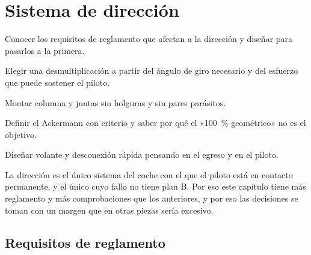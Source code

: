 \chapter{Sistema de dirección}
\label{ch:direccion}

\begin{objetivos}
  \item Conocer los requisitos de reglamento que afectan a la dirección y
        diseñar para pasarlos a la primera.
  \item Elegir una desmultiplicación a partir del ángulo de giro necesario y del
        esfuerzo que puede sostener el piloto.
  \item Montar columna y juntas sin holguras y sin pares parásitos.
  \item Definir el Ackermann con criterio y saber por qué el «\SI{100}{\percent}
        geométrico» no es el objetivo.
  \item Diseñar volante y desconexión rápida pensando en el egreso y en el
        piloto.
\end{objetivos}


La dirección es el único sistema del coche con el que el piloto está en
contacto permanente, y el único cuyo fallo no tiene plan B. Por eso este
capítulo tiene más reglamento y más comprobaciones que los anteriores, y por eso
las decisiones se toman con un margen que en otras piezas sería excesivo.

\section{Requisitos de reglamento}
\label{sec:direccion:01}

